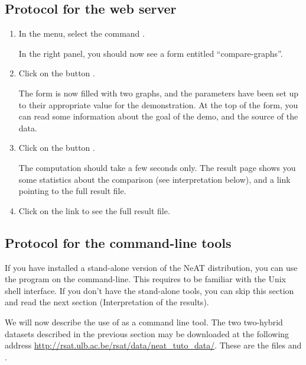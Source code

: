 \subsection{Protocol for the web server}

\begin{enumerate}

\item In the \neat menu, select the command . 

  In the right panel, you should now see a form entitled
  ``compare-graphs''.

\item Click on the button . 

  The form is now filled with two graphs, and the parameters have been
  set up to their appropriate value for the demonstration. At the top
  of the form, you can read some information about the goal of the
  demo, and the source of the data.

\item Click on the button . 

  The computation should take a few seconds only. The result page
  shows you some statistics about the comparison (see interpretation
  below), and a link pointing to the full result file. 

\item Click on the link to see the full result file. 


\end{enumerate}

\subsection{Protocol for the command-line tools}

If you have installed a stand-alone version of the NeAT distribution,
you can use the program  on the
command-line. This requires to be familiar with the Unix shell
interface. If you don't have the stand-alone tools, you can skip this
section and read the next section (Interpretation of the results).

We will now describe the use of  as a command line tool. 
The two two-hybrid datasets described
in the previous section may be downloaded at the following address \url{http://rsat.ulb.ac.be/rsat/data/neat\_tuto\_data/}. 
These are the files  and .

